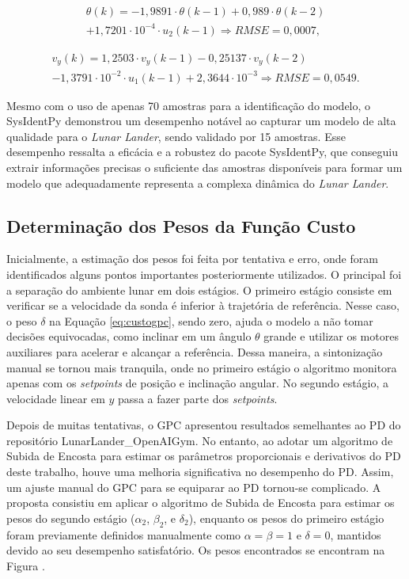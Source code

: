 \documentclass[12pt,           %
a4paper,                       %
openany,                       %
oneside,                       %
chapter=TITLE,                 %
english,                       %
spanish,                       %
brazil,                        %
sumario=tradicional]{abntex2}  %
\begin{document}
\begin{OnehalfSpace}
\begin{equation}
\begin{matrix}
    \theta(k) = -1,9891\cdot \theta(k-1) +0,989\cdot \theta(k-2)\\
    +1,7201\cdot 10^{-4}\cdot u_2(k-1)\Rightarrow RMSE=0,0007,
\end{matrix} 
\end{equation}

\begin{equation}
\begin{matrix}
    v_y(k) = 1,2503\cdot v_y(k-1) - 0,25137\cdot v_y(k-2)\\
    -1,3791\cdot 10^{-2}\cdot u_1(k-1)+2,3644\cdot 10^{-3}\Rightarrow RMSE=0,0549.
\end{matrix} 
\end{equation}

Mesmo com o uso de apenas 70 amostras para a identificação do modelo, o SysIdentPy demonstrou um desempenho notável ao capturar um modelo de alta qualidade para o \textit{Lunar Lander}, sendo validado por 15 amostras. Esse desempenho ressalta a eficácia e a robustez do pacote SysIdentPy, que conseguiu extrair informações precisas o suficiente das amostras disponíveis para formar um modelo que adequadamente representa a complexa dinâmica do \textit{Lunar Lander}.

\subsection{Determinação dos Pesos da Função Custo}
\label{subsec:GPCpesos}  

Inicialmente, a estimação dos pesos foi feita por tentativa e erro, onde foram identificados alguns pontos importantes posteriormente utilizados. O principal foi a separação do ambiente lunar em dois estágios. O primeiro estágio consiste em verificar se a velocidade da sonda é inferior à trajetória de referência. Nesse caso, o peso $\delta$ na Equação \ref{eq:custogpc}, sendo zero, ajuda o modelo a não tomar decisões equivocadas, como inclinar em um ângulo $\theta$ grande e utilizar os motores auxiliares para acelerar e alcançar a referência. Dessa maneira, a sintonização manual se tornou mais tranquila, onde no primeiro estágio o algoritmo monitora apenas com os \textit{setpoints} de posição e inclinação angular. No segundo estágio, a velocidade linear em $y$ passa a fazer parte dos \textit{setpoints}.

Depois de muitas tentativas, o GPC apresentou resultados semelhantes ao PD do repositório LunarLander\_OpenAIGym. No entanto, ao adotar um algoritmo de Subida de Encosta para estimar os parâmetros proporcionais e derivativos do PD deste trabalho, houve uma melhoria significativa no desempenho do PD. Assim, um ajuste manual do GPC para se equiparar ao PD tornou-se complicado. A proposta consistiu em aplicar o algoritmo de Subida de Encosta para estimar os pesos do segundo estágio ($\alpha_2$, $\beta_2$, e $\delta_2$), enquanto os pesos do primeiro estágio foram previamente definidos manualmente como $\alpha=\beta=1$ e $\delta=0$, mantidos devido ao seu desempenho satisfatório. Os pesos encontrados se encontram na Figura \label{fig:setp12}.


\end{OnehalfSpace}
\end{document}
